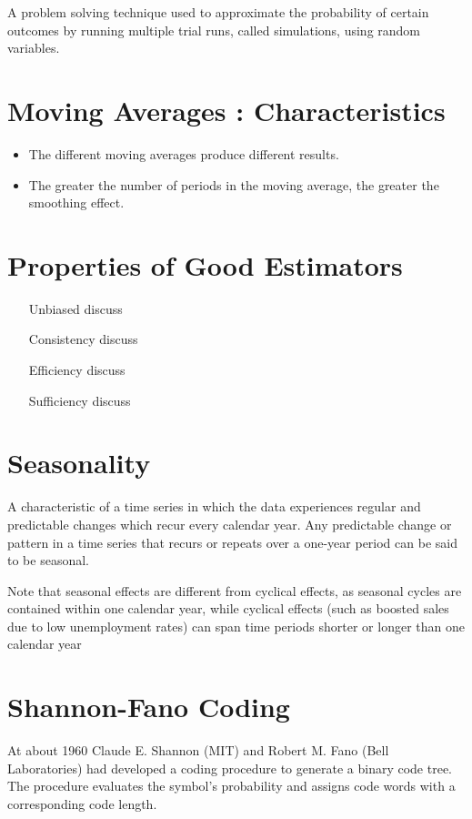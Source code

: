\begin{enumerate}
A problem solving technique used to approximate the probability of certain outcomes by running multiple trial runs, called simulations, using random variables.
\section{ Moving Averages : Characteristics}
\begin{itemize}
	\item The different moving averages produce different results.
	\item The greater the number of periods in the moving average, the greater the smoothing effect.
\end{itemize}


\section{Properties of Good Estimators}

\begin{itemize}
	\item[Unbiased] discuss
	\item[Consistency] discuss
	\item[Efficiency] discuss
	\item[Sufficiency] discuss
\end{itemize}



\section{Seasonality}
A characteristic of a time series in which the data experiences regular and predictable changes which recur every calendar year. Any predictable change or pattern in a time series that recurs or repeats over a one-year period can be said to be seasonal.

Note that seasonal effects are different from cyclical effects, as seasonal cycles are contained within one calendar year, while cyclical effects (such as boosted sales due to low unemployment rates) can span time periods shorter or longer than one calendar year


\section{Shannon-Fano Coding}

At about 1960 Claude E. Shannon (MIT) and Robert M. Fano (Bell Laboratories) had developed a coding procedure to generate a binary code tree. The procedure evaluates the symbol's probability and assigns code words with a corresponding code length.


\end{enumerate}
